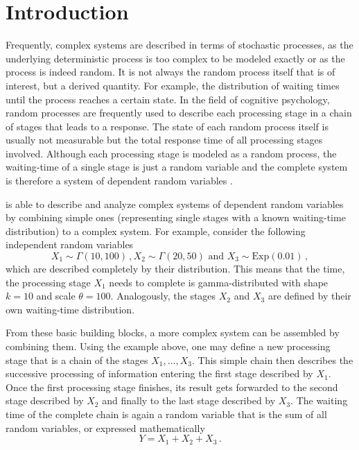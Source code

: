  \section{Introduction} \label{sec:intro}
Frequently, complex systems are described in terms of stochastic processes, as the
underlying deterministic process is too complex to be modeled exactly or as the
process is indeed random. It is not always the random process itself that is of 
interest, but a derived quantity. For example, the distribution of waiting times until the
process reaches a certain state. In the field of cognitive psychology, random processes are frequently used to
describe each processing stage in a chain of stages that leads to a response. The state of
each random process itself is usually not measurable but the total response time of all processing 
stages involved. Although each processing stage is modeled as a random process, the waiting-time
of a single stage is just a random variable and the complete system is therefore a system of dependent random 
variables \cite[e.g., the EZ-Reader model,][]{Reichle2003}.

 is able to describe and analyze complex systems of dependent random variables
by combining simple ones (representing single stages with a known waiting-time distribution) to
a complex system. For example, consider the following independent random variables
\begin{equation}
  X_1 \sim \Gamma(10, 100)\,, X_2 \sim \Gamma(20, 50)\text{ and } X_3 \sim \text{Exp}(0.01)\,,\nonumber
\end{equation}
which are described completely by their distribution. This means that the time, the
processing stage $X_1$ needs to complete is gamma-distributed with shape $k=10$ and scale
$\theta=100$. Analogously, the stages $X_2$ and $X_3$ are defined by their own waiting-time 
distribution.

From these basic building blocks, a more complex system can be assembled by
combining them. Using the example above, one may define a new processing stage that is a chain of
the stages $X_1,\dots,X_3$. This simple chain then describes the successive
processing of information entering the first stage described by $X_1$.
Once the first processing stage finishes, its result gets forwarded to the second stage described
by $X_2$ and finally to the last stage described by $X_3$. The waiting time of the
complete chain is again a random variable that is the sum of all random variables,
or expressed mathematically
\begin{equation}
 Y = X_1 + X_2 + X_3\,. \nonumber
\end{equation}

